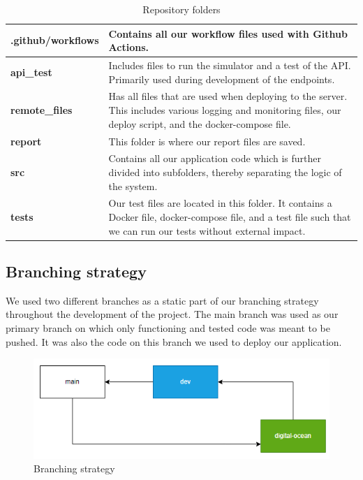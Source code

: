\begin{table}[]
    \centering
    \begin{tabular}{|l|l|}
    \hline
    \textbf{.github/workflows} & Contains all our workflow files used with Github Actions.                                                                                                          \\ \hline
    \textbf{api\_test}         & Includes files to run the simulator and a test of the API. Primarily used during development of the endpoints.                                                     \\ \hline
    \textbf{remote\_files}     & Has all files that are used when deploying to the server. This includes various logging and monitoring files, our deploy script, and the docker-compose file.      \\ \hline
    \textbf{report}            & This folder is where our report files are saved.                                                                                                                   \\ \hline
    \textbf{src}               & Contains all our application code which is further divided into subfolders, thereby separating the logic of the system.                                            \\ \hline
    \textbf{tests}             & Our test files are located in this folder. It contains a Docker file, docker-compose file, and a test file such that we can run our tests without external impact. \\ \hline
    \end{tabular}
    \caption{Repository folders}
    \label{tab:repo_folders}
    \end{table}

\subsection{Branching strategy}
We used two different branches as a static part of our branching strategy throughout the development of the project. 
The main branch was used as our primary branch on which only functioning and tested code was meant to be pushed. It was
also the code on this branch we used to deploy our application. 

\begin{figure}[H]
    \centering
    \captionsetup{justification=centering,margin=1cm}
    \includegraphics[width=0.8\linewidth]{report/images/branching.png}
    \caption{Branching strategy}
    \label{fig:minitwit}
\end{figure}


